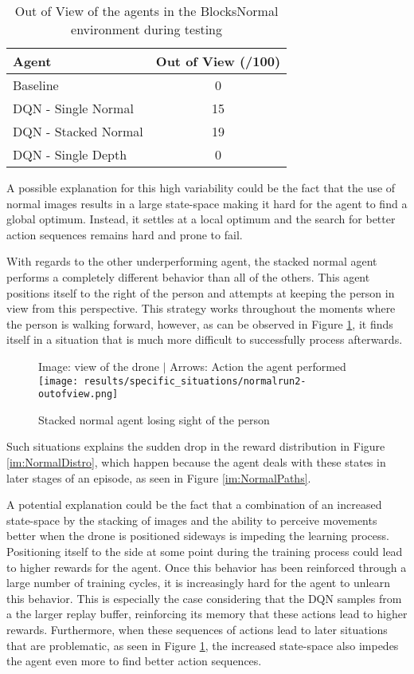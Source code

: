 \begin{table}[h]
    \centering
    \caption{Out of View of the agents in the BlocksNormal environment during testing}
    \label{tab:NormalEnds}
    \begin{tabular}{l|c}
    \textbf{Agent}       & \textbf{Out of View (/100)} \\ \hline
    Baseline             & 0                           \\ \hline
    DQN - Single Normal  & 15                          \\
    DQN - Stacked Normal & 19                          \\
    DQN - Single Depth   & 0                         
    \end{tabular}
\end{table}

A possible explanation for this high variability could be the fact that the use of 
normal images results in a large state-space making it hard for the 
agent to find a global optimum. Instead, it settles at a local optimum and the search 
for better action sequences remains hard and prone to fail.  

With regards to the other underperforming agent, the stacked normal agent
performs a completely different behavior than 
all of the others. This agent positions itself to the right of the person 
and attempts at keeping the person in view from this perspective. This strategy works 
throughout the moments where the person is walking forward, however, as can be observed 
in Figure \ref{im:normalrun2loses}, it finds itself in a situation that is much more difficult to successfully 
process afterwards. 

\begin{figure}[h]
    \small 
    Image: view of the drone $|$ Arrows: Action the agent performed
    \centering
    \texttt{[image: results/specific\_situations/normalrun2-outofview.png]}
    \caption{Stacked normal agent losing sight of the person}
    \label{im:normalrun2loses}
\end{figure}

Such situations explains the sudden drop 
in the reward distribution in Figure \ref{im:NormalDistro}, which happen because 
the agent deals with these states in later stages of an episode, as seen in Figure \ref{im:NormalPaths}.

A potential explanation could be the fact that a combination of an increased state-space 
by the stacking of images and the ability to perceive movements better when the drone is 
positioned sideways is impeding the learning process. Positioning itself to the side at 
some point during the training process could lead to higher rewards for the agent. 
Once this behavior has been reinforced through a large number of training cycles, it is 
increasingly hard for the agent to unlearn this behavior. This is especially the case considering 
that the DQN samples from a the larger replay buffer, reinforcing its memory that these 
actions lead to higher rewards. Furthermore, when these sequences of actions lead to 
later situations that are problematic, as seen in Figure \ref{im:normalrun2loses}, the 
increased state-space also impedes the agent even more to find better action sequences. 

